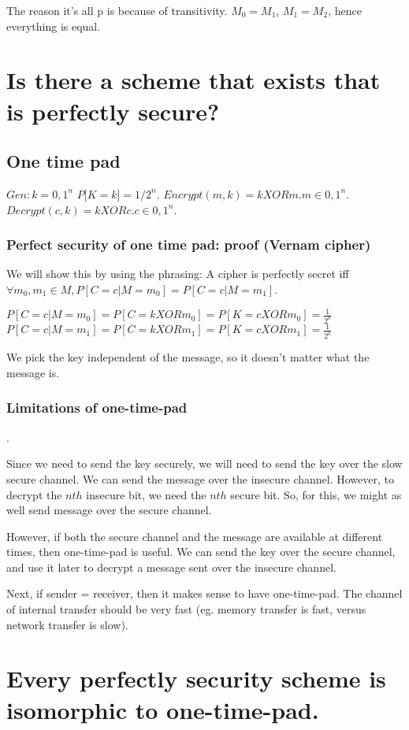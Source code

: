 The reason it's all p is because of transitivity. $M_0 = M_1$, $M_1 = M_2$, hence everything is equal.

\section{Is there a scheme that exists that is perfectly secure?}

\subsection{One time pad}
$Gen: k = {0, 1}^n$
$P \lbrack K=k \rbrack = 1 / 2^n$.
$Encrypt(m, k) = k XOR m. m \in {0, 1}^n$.
$Decrypt(c, k) = k XOR c. c \in {0, 1}^n$.

\subsubsection{Perfect security of one time pad: proof (Vernam cipher)}
We will show this by using the phrasing:
A cipher is perfectly secret iff $\forall m_0, m_1 \in M, P[C=c|M=m_0] = P[C=c|M=m_1]$.

$P[C=c|M=m_0] = P[C=k XOR m_0] = P[K=c XOR m_0] = \frac{1}{2^k}$
$P[C=c|M=m_1] = P[C=k XOR m_1] = P[K=c XOR m_1] = \frac{1}{2^k}$

We pick the key independent of the message, so it doesn't matter what the message is.

\subsubsection{Limitations of one-time-pad}.

Since we need to send the key securely, we will need to send the key over the slow secure channel. We can
send the message over the insecure channel. However, to decrypt the $nth$ insecure bit, we need the $nth$
secure bit. So, for this, we might as well send message over the secure channel.


However, if both the secure channel and the message are available at different times, then one-time-pad is useful.
We can send the key over the secure channel, and use it later to decrypt a message sent over the insecure channel.


Next, if sender = receiver, then it makes sense to have one-time-pad. The channel of internal transfer should be
very fast (eg. memory transfer is fast, versus network transfer is slow).

\section{Every perfectly security scheme is isomorphic to one-time-pad.}
